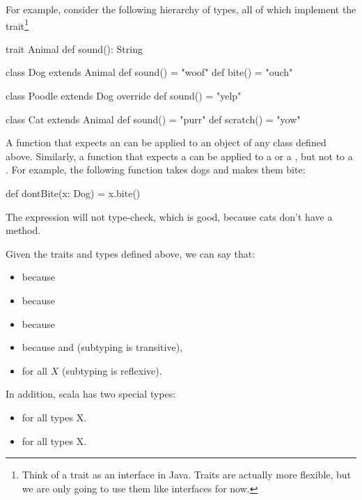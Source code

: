 \documentclass[9pt]{extbook}
\begin{document}
For example, consider the following hierarchy of types, all of which
implement the  trait\footnote{Think of a trait as an interface in Java. Traits
are actually more flexible, but we are only going to use them like interfaces for now.}
%
\begin{scalacode}
trait Animal {
  def sound(): String
}

class Dog extends Animal {
  def sound() = "woof"
  def bite() = "ouch"
}

class Poodle extends Dog {
  override def sound() = "yelp"
}

class Cat extends Animal {
  def sound() = "purr"
  def scratch() = "yow"
}
\end{scalacode}

A function that expects an  can be applied to an object
of any class defined above. Similarly, a function that expects a 
can be applied to a  or a , but not to a
. For example, the following function takes dogs and makes
them bite:
\begin{scalacode}
def dontBite(x: Dog) = {
  x.bite()
}
\end{scalacode}

The expression  will not type-check, which
is good, because cats don't have a  method.

Given the traits and types defined above, we can say that:
\begin{itemize}

  \item {} because 

  \item {} because 

  \item {} because 

  \item {} because  and
   (subtyping is transitive),

  \item {} for all $X$ (subtyping is reflexive).

\end{itemize}
%
In addition, scala has two special types:
%
\begin{itemize}

  \item {} for all types X.

  \item {} for all types X.

\end{itemize}
\end{document}
